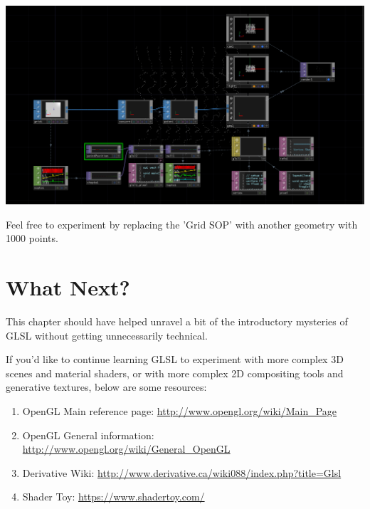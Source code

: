 \begin{fullwidth}
\begin{center}
\includegraphics{./img/12.6.3/step2_3.png}
\end{center}

Feel free to experiment by replacing the 'Grid SOP' with another geometry with 1000 points.

\end{fullwidth}
\section{What Next?}
\begin{fullwidth}
This chapter should have helped unravel a bit of the introductory mysteries of GLSL without getting unnecessarily technical.

If you'd like to continue learning GLSL to experiment with more complex 3D scenes and material shaders, or with more complex 2D compositing tools and generative textures, below are some resources:

\begin{enumerate}
\item OpenGL Main reference page: \url{http://www.opengl.org/wiki/Main_Page}
\item OpenGL General information: \url{http://www.opengl.org/wiki/General_OpenGL}
\item Derivative Wiki: \url{http://www.derivative.ca/wiki088/index.php?title=Glsl}
\item Shader Toy: \url{https://www.shadertoy.com/}
\end{enumerate}
\end{fullwidth}
